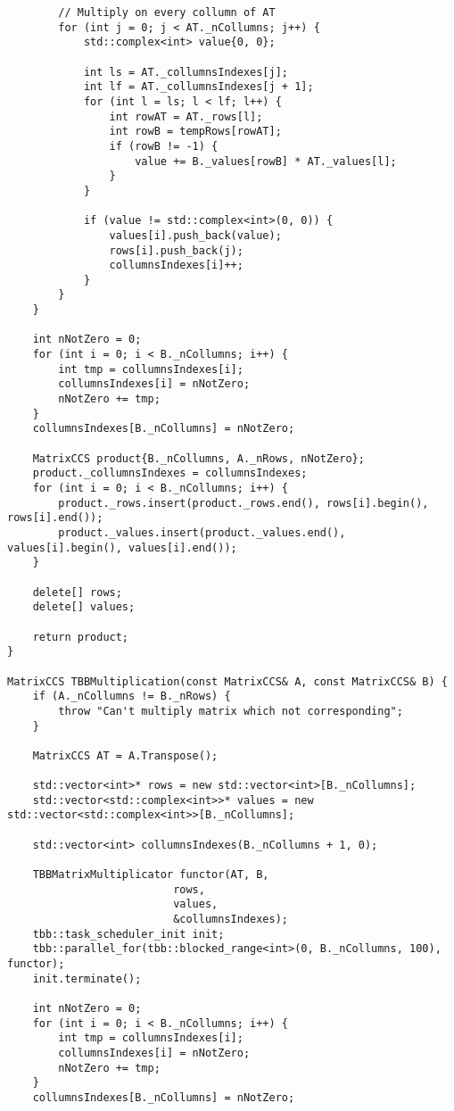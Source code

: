 \documentclass{report}
\begin{document}
\begin{lstlisting}
        // Multiply on every collumn of AT
        for (int j = 0; j < AT._nCollumns; j++) {
            std::complex<int> value{0, 0};

            int ls = AT._collumnsIndexes[j];
            int lf = AT._collumnsIndexes[j + 1];
            for (int l = ls; l < lf; l++) {
                int rowAT = AT._rows[l];
                int rowB = tempRows[rowAT];
                if (rowB != -1) {
                    value += B._values[rowB] * AT._values[l];
                }
            }

            if (value != std::complex<int>(0, 0)) {
                values[i].push_back(value);
                rows[i].push_back(j);
                collumnsIndexes[i]++;
            }
        }
    }

    int nNotZero = 0;
    for (int i = 0; i < B._nCollumns; i++) {
        int tmp = collumnsIndexes[i];
        collumnsIndexes[i] = nNotZero;
        nNotZero += tmp;
    }
    collumnsIndexes[B._nCollumns] = nNotZero;

    MatrixCCS product{B._nCollumns, A._nRows, nNotZero};
    product._collumnsIndexes = collumnsIndexes;
    for (int i = 0; i < B._nCollumns; i++) {
        product._rows.insert(product._rows.end(), rows[i].begin(), rows[i].end());
        product._values.insert(product._values.end(), values[i].begin(), values[i].end());
    }

    delete[] rows;
    delete[] values;

    return product;
}

MatrixCCS TBBMultiplication(const MatrixCCS& A, const MatrixCCS& B) {
    if (A._nCollumns != B._nRows) {
        throw "Can't multiply matrix which not corresponding";
    }

    MatrixCCS AT = A.Transpose();

    std::vector<int>* rows = new std::vector<int>[B._nCollumns];
    std::vector<std::complex<int>>* values = new std::vector<std::complex<int>>[B._nCollumns];

    std::vector<int> collumnsIndexes(B._nCollumns + 1, 0);

    TBBMatrixMultiplicator functor(AT, B,
                          rows,
                          values,
                          &collumnsIndexes);
    tbb::task_scheduler_init init;
    tbb::parallel_for(tbb::blocked_range<int>(0, B._nCollumns, 100), functor);
    init.terminate();

    int nNotZero = 0;
    for (int i = 0; i < B._nCollumns; i++) {
        int tmp = collumnsIndexes[i];
        collumnsIndexes[i] = nNotZero;
        nNotZero += tmp;
    }
    collumnsIndexes[B._nCollumns] = nNotZero;


\end{lstlisting}
\end{document}
